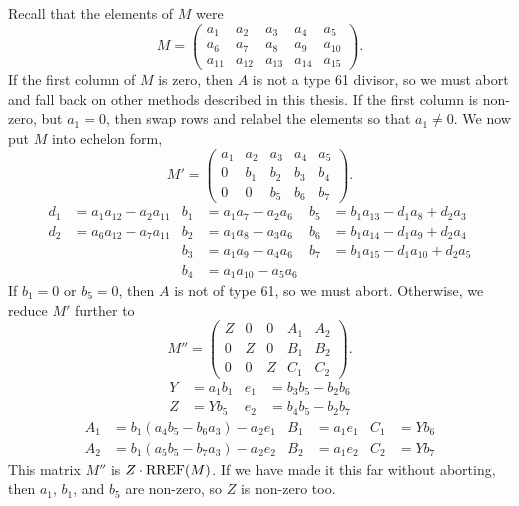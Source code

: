 Recall that the elements of $M$ were
\[ M =
\begin{pmatrix}
  a_1 & a_2 & a_3 & a_4 & a_5 \\
  a_6 & a_7 & a_8 & a_9 & a_{10} \\
  a_{11} & a_{12} & a_{13} & a_{14} & a_{15}
\end{pmatrix}. \]
If the first column of $M$ is zero, then $A$ is not a type 61 divisor,
so we must abort and fall back on other methods described in this thesis.
If the first column is non-zero, but $a_1 = 0$, then swap rows and relabel the elements so that $a_1 \neq 0$.
We now put $M$ into echelon form,
\[ M' =
\begin{pmatrix}
  a_1 & a_2 & a_3 & a_4 & a_5 \\
    0 & b_1 & b_2 & b_3 & b_4 \\
    0 &   0 & b_5 & b_6 & b_7
\end{pmatrix}. \]
\begin{align*}
  d_1 &= a_1a_{12} - a_2a_{11} & b_1 &= a_1a_7    - a_2a_6 & b_5 &= b_1a_{13} - d_1a_8    + d_2a_3 \\
  d_2 &= a_6a_{12} - a_7a_{11} & b_2 &= a_1a_8    - a_3a_6 & b_6 &= b_1a_{14} - d_1a_9    + d_2a_4 \\
      &                        & b_3 &= a_1a_9    - a_4a_6 & b_7 &= b_1a_{15} - d_1a_{10} + d_2a_5 \\
      &                        & b_4 &= a_1a_{10} - a_5a_6
\end{align*}
If $b_1 = 0$ or $b_5 = 0$, then $A$ is not of type 61, so we must abort.
Otherwise, we reduce $M'$ further to
\[ M'' =
\begin{pmatrix}
  Z & 0 & 0 & A_1 & A_2 \\
  0 & Z & 0 & B_1 & B_2 \\
  0 & 0 & Z & C_1 & C_2
\end{pmatrix}. \]
\begin{align*}
  Y &= a_1b_1 & e_1 &= b_3b_5 - b_2b_6 \\
  Z &= Yb_5   & e_2 &= b_4b_5 - b_2b_7
\end{align*}
\begin{align*}
  A_1 &= b_1(a_4b_5 - b_6a_3) - a_2e_1 & B_1 &= a_1e_1 & C_1 &= Yb_6 \\
  A_2 &= b_1(a_5b_5 - b_7a_3) - a_2e_2 & B_2 &= a_1e_2 & C_2 &= Yb_7
\end{align*}
This matrix $M''$ is $Z \cdot \operatorname{RREF}(M)$.
If we have made it this far without aborting, then $a_1$, $b_1$, and $b_5$ are non-zero, so $Z$ is non-zero too.

